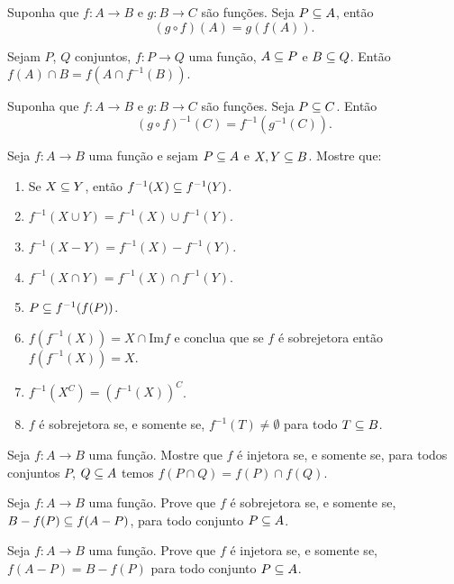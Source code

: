 \documentclass[12pt]{exam}
\begin{document}
    \vspace{.3cm}

    \questao{} Suponha que $f : A \to B$ e $g : B \to C$ são funções. Seja $P \subseteq A$, então
    \[
        (g \circ f)(A) = g(f(A)).
    \]

    \vspace{.3cm}

    \questao{} Sejam $P$, $Q$ conjuntos, $f : P \to Q$ uma função, $A \subseteq P$ e $B \subseteq Q$. Então $f(A) \cap B = f(A \cap f^{-1}(B))$.

    \vspace{.3cm}

    \questao{} Suponha que $f : A \to B$ e $g : B \to C$ são funções. Seja $P \subseteq C$. Então
    \[
        (g \circ f)^{-1}(C) = f^{-1}(g^{-1}(C)).
    \]

    \questao{} Seja $f : A \to B$ uma fun{\c c}{\~a}o e sejam $P \subseteq
    A$ e $X, Y\subseteq B$. Mostre que:
    \begin{enumerate}[label={\alph*})]
        \item Se $X\subseteq Y$, ent{\~a}o $f^{-1}(X)\subseteq f^{-1}(Y)$.

        \item $f^{-1}(X\cup Y)=f^{-1}(X)\cup f^{-1}(Y)$.

        \item $f^{-1}(X - Y) = f^{-1}(X) - f^{-1}(Y)$.

        \item $f^{-1}(X\cap Y)= f^{-1}(X)\cap f^{-1}(Y)$.

        \item $P\subseteq f^{-1}(f(P))$.

        \item $f(f^{-1}(X))= X \cap \mbox{Im}f$ e conclua que se $f$ {\'e} sobrejetora ent{\~a}o
        $f(f^{-1}(X))=X$.
        \item $f^{-1}(X^C) = (f^{-1}(X))^C$.

        \item $f$ \'e sobrejetora se, e somente se, $f^{-1}(T) \ne \emptyset$ para todo $T \subseteq B$.
    \end{enumerate}

    \vspace{.3cm}

    \questao{} Seja $f : A \to B$ uma função. Mostre que $f$ é injetora se, e somente se, para todos conjuntos $P$, $Q \subseteq A$ temos $f(P \cap Q) = f(P) \cap f(Q)$.

    \vspace{.3cm}

    \questao{} Seja $f : A \to B$ uma função. Prove que $f$ é sobrejetora se, e somente se, $B - f(P) \subseteq f(A - P)$, para todo conjunto $P \subseteq A$.

    \vspace{.3cm}

    \questao{} Seja $f: A \to B$ uma função. Prove que $f$ é injetora se, e somente se, $f(A - P) = B - f(P)$ para todo conjunto $P \subseteq A$.
\end{document}
